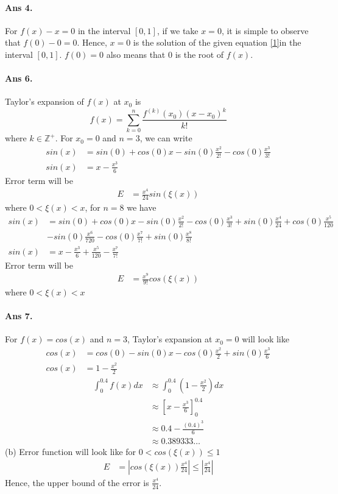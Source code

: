 \documentclass[12pt]{report}
\begin{document}
\paragraph*{Ans 4.} For $f(x) - x = 0 \label{1}$ in the interval $[0,1]$, if we take $ x= 0$, it is simple to observe that $ f(0) - 0 = 0$. Hence, $x= 0$ is the solution of the given equation \ref{1}in the interval $[0,1]$. $f(0) = 0$ also means that $0$ is the root of $f(x)$. 

\paragraph*{Ans 6.} Taylor's expansion of $f(x)$ at $x_0$ is
$$ f(x) =  \sum\limits_{k=0}^{n} \frac{f^{(k)}(x_0) (x - x_0)^k}{k!} 
$$ where $k \in \mathbb{Z^+}$. For $x_0 = 0$ and $n=3$, we can write
\begin{align*}
    sin(x) &= sin(0) + cos(0)x - sin(0) \frac{x^2}{2!} - cos(0)\frac{x^3}{3!}\\
    sin(x) &= x - \frac{x^3}{6}
\end{align*}
Error term will be 
\begin{align*}
    E &= \frac{x^4}{24}sin(\xi(x))
\end{align*}
where $0 < \xi(x) < x$, for $n = 8$ we have
\begin{align*}
    sin(x) &= sin(0) + cos(0)x - sin(0) \frac{x^2}{2!} - cos(0)\frac{x^3}{3!} + sin(0) \frac{x^4}{24} + cos(0)\frac{x^5}{120} \\ &- sin(0)\frac{x^6}{720} - cos(0)\frac{x^7}{7!} + sin(0)\frac{x^8}{8!}\\
    sin(x) &= x - \frac{x^3}{6} + \frac{x^5}{120} - \frac{x^7}{7!}
\end{align*}
Error term will be
\begin{align*}
    E &= \frac{x^9}{9!}cos(\xi(x))
\end{align*}
where $0 < \xi(x) < x$
\paragraph*{Ans 7.} For $f(x) = cos(x)$ and $n = 3$, Taylor's expansion at $x_0 = 0$ will look like
\begin{align*}
    cos(x) &= cos(0) - sin(0)x - cos(0)\frac{x^2}{2} + sin(0)\frac{x^3}{6}\\
    cos(x) &= 1 - \frac{x^2}{2}
\end{align*}
\begin{align*}
    \int_{0}^{0.4} f(x)dx &\approx \int_{0}^{0.4}\left(1 - \frac{x^2}{2}\right) dx\\
    &\approx \left[x - \frac{x^3}{6}\right]_{0}^{0.4}\\
    & \approx 0.4 - \frac{(0.4)^3}{6}\\
    & \approx 0.389333 \dots
\end{align*}
(b) Error function will look like for $0 < cos(\xi(x)) \leq 1$
\begin{align*}
    E &= \left|cos(\xi(x))\frac{x^4}{24}\right| \leq \left|\frac{x^4}{24}\right|
\end{align*} 
Hence, the upper bound of the error is $\frac{x^4}{24}$.
\end{document}
